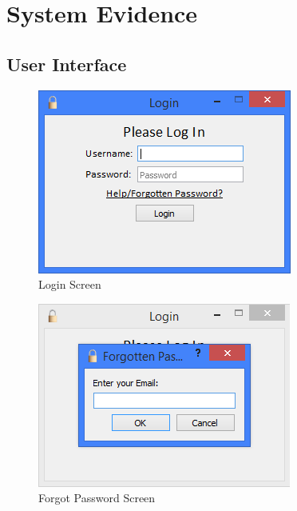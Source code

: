 \section{System Evidence}

\subsection{User Interface}

\begin{figure}[H]
    \caption{Login Screen} \label{fig:LoginScreen}
    \includegraphics[width=\textwidth]{./Maintenance/UserInterface/LoginScreen.png}
\end{figure}

\begin{figure}[H]
    \caption{Forgot Password Screen} \label{fig:ForgotPasswordScreen}
    \includegraphics[width=\textwidth]{./Maintenance/UserInterface/ForgotPasswordScreen.png}
\end{figure}

